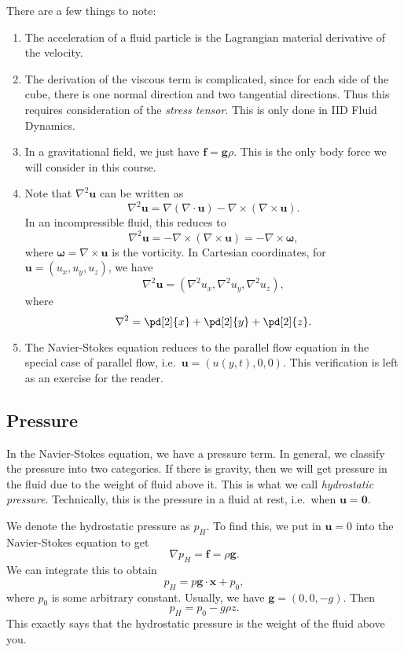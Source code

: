 \documentclass[a4paper]{article}
\begin{document}
There are a few things to note:
\begin{enumerate}
  \item The acceleration of a fluid particle is the Lagrangian material derivative of the velocity.
  \item The derivation of the viscous term is complicated, since for each side of the cube, there is one normal direction and two tangential directions. Thus this requires consideration of the \emph{stress tensor}. This is only done in IID Fluid Dynamics.
  \item In a gravitational field, we just have $\mathbf{f} = \mathbf{g}\rho$. This is the only body force we will consider in this course.
  \item Note that $\nabla^2 \mathbf{u}$ can be written as
    \[
      \nabla^2 \mathbf{u} = \nabla (\nabla \cdot \mathbf{u}) - \nabla \times (\nabla \times \mathbf{u}).
    \]
    In an incompressible fluid, this reduces to
    \[
      \nabla^2 \mathbf{u} = -\nabla \times (\nabla \times \mathbf{u}) = -\nabla \times \boldsymbol\omega,
    \]
    where $\boldsymbol\omega = \nabla \times \mathbf{u}$ is the vorticity. In Cartesian coordinates, for $\mathbf{u} = (u_x, u_y, u_z)$, we have
    \[
      \nabla^2 \mathbf{u} = (\nabla^2 u_x, \nabla^2 u_y, \nabla^2 u_z),
    \]
    where
    \[
      \nabla^2 = \pd[2]{x} + \pd[2]{y} + \pd[2]{z}.
    \]
  \item The Navier-Stokes equation reduces to the parallel flow equation in the special case of parallel flow, i.e.\ $\mathbf{u} = (u(y, t), 0, 0)$. This verification is left as an exercise for the reader.
\end{enumerate}

\subsection{Pressure}
In the Navier-Stokes equation, we have a pressure term. In general, we classify the pressure into two categories. If there is gravity, then we will get pressure in the fluid due to the weight of fluid above it. This is what we call \emph{hydrostatic pressure}. Technically, this is the pressure in a fluid at rest, i.e.\ when $\mathbf{u} = \mathbf{0}$.

We denote the hydrostatic pressure as $p_H$. To find this, we put in $\mathbf{u} = 0$ into the Navier-Stokes equation to get
\[
  \nabla p_H = \mathbf{f} = \rho \mathbf{g}.
\]
We can integrate this to obtain
\[
  p_H = p \mathbf{g}\cdot \mathbf{x} + p_0,
\]
where $p_0$ is some arbitrary constant. Usually, we have $\mathbf{g} = (0, 0, -g)$. Then
\[
  p_H = p_0 - g \rho z.
\]
This exactly says that the hydrostatic pressure is the weight of the fluid above you.
\end{document}

